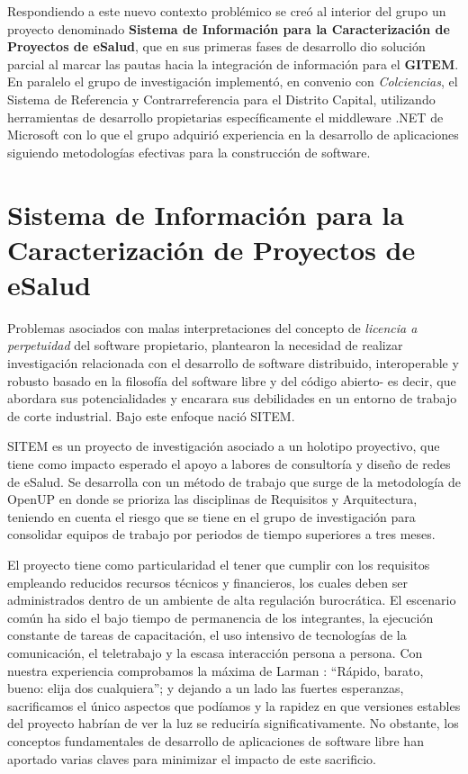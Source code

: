Respondiendo a este nuevo contexto problémico se creó al interior del grupo un proyecto denominado \textbf{Sistema de Información para la Caracterización de Proyectos de eSalud}, que en sus primeras fases de desarrollo dio solución parcial al marcar las pautas hacia la integración de información para el \textbf{GITEM}. En paralelo el grupo de investigación implementó, en convenio con \textit{Colciencias}, el Sistema de Referencia y Contrarreferencia para el Distrito Capital, utilizando herramientas de desarrollo propietarias específicamente el middleware .NET de Microsoft con lo que el grupo adquirió experiencia en la desarrollo de aplicaciones siguiendo metodologías efectivas para la construcción de software.

\section{Sistema de Información para la Caracterización de Proyectos de eSalud}

Problemas asociados con malas interpretaciones del concepto de \textit{licencia a perpetuidad} del software propietario, plantearon la necesidad de realizar investigación relacionada con el desarrollo de software distribuido, interoperable y robusto basado en la filosofía del software libre y del código abierto- es decir, que abordara sus potencialidades y encarara sus debilidades en un entorno de trabajo de corte industrial. Bajo este enfoque nació SITEM.

SITEM es un proyecto de investigación asociado a un holotipo proyectivo\cite{hurtado2000}, que tiene como impacto esperado el apoyo a labores de consultoría y diseño de redes de eSalud. Se desarrolla con un método de trabajo que surge de la metodología de OpenUP\cite{balduino2010} en donde se prioriza las disciplinas de Requisitos y Arquitectura, teniendo en cuenta el riesgo que se tiene en el grupo de investigación para consolidar equipos de trabajo por periodos de tiempo superiores a tres meses.

El proyecto tiene como particularidad el tener que cumplir con los requisitos empleando reducidos recursos técnicos y financieros, los cuales deben ser administrados dentro de un ambiente de alta regulación burocrática. El escenario común ha sido el bajo tiempo de permanencia de los integrantes, la ejecución constante de tareas de capacitación, el uso intensivo de tecnologías de la comunicación, el teletrabajo  y la escasa interacción persona a persona. Con nuestra experiencia comprobamos la máxima de Larman \cite{larman2003} : “Rápido, barato, bueno: elija dos cualquiera”; y dejando a un lado las fuertes esperanzas, sacrificamos el único aspectos que podíamos y la rapidez en que versiones estables del proyecto habrían de ver la luz se reduciría significativamente. No obstante, los conceptos fundamentales de desarrollo de aplicaciones de software libre \cite{raymond} han aportado varias claves para minimizar el impacto de este sacrificio.

